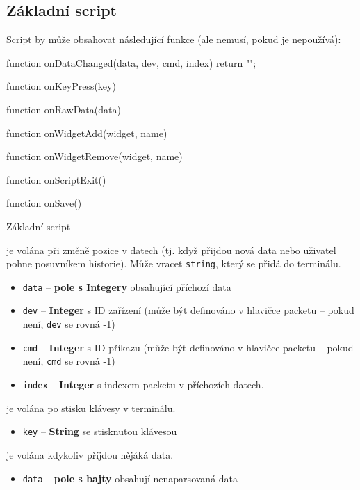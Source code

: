 \documentclass[12pt, a4paper, oneside]{article}
\begin{document}
\newpage
\subsection*{Základní script}
Script by může obsahovat následující funkce (ale nemusí, pokud je nepoužívá):
\begin{listing}[H]
\begin{jscode}
function onDataChanged(data, dev, cmd, index) {
    return "";
}

function onKeyPress(key) {
}

function onRawData(data) {
}

function onWidgetAdd(widget, name) {
}

function onWidgetRemove(widget, name) {
}

function onScriptExit() {
}

function onSave() {
}
\end{jscode}
\caption{Základní script}
\label{input_script}
\end{listing}

 je volána při změně pozice v datech (tj. když přijdou nová data nebo uživatel pohne posuvníkem historie). Může vracet \verb/string/, který se přidá do terminálu.

\begin{itemize}
    \item \verb/data/ -- {\bf pole s Integery} obsahující příchozí data
    \item \verb/dev/ -- {\bf Integer} s ID zařízení (může být definováno v hlavičce packetu -- pokud není, \verb/dev/ se rovná -1)
    \item \verb/cmd/ -- {\bf Integer} s ID příkazu (může být definováno v hlavičce packetu -- pokud není, \verb/cmd/ se rovná -1)
    \item \verb/index/ -- {\bf Integer} s indexem packetu v příchozích datech.
\end{itemize}

 je volána po stisku klávesy v terminálu.
\begin{itemize}
    \item \verb/key/ -- {\bf String} se stisknutou klávesou
\end{itemize}

 je volána kdykoliv příjdou nějáká data.
\begin{itemize}
    \item \verb/data/ -- {\bf pole s bajty} obsahují nenaparsovaná data
\end{itemize}
\end{document}
